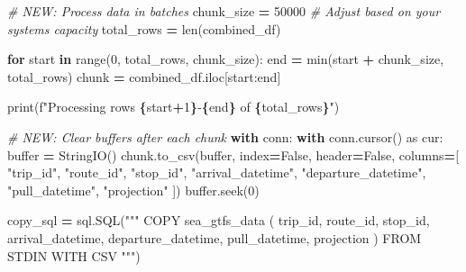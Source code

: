 \documentclass[
  12pt,
]{article}
\newenvironment{Shaded}{\begin{snugshade}}{\end{snugshade}}
\newcommand{\BuiltInTok}[1]{#1}
\newcommand{\CommentTok}[1]{\textcolor[rgb]{0.56,0.35,0.01}{\textit{#1}}}
\newcommand{\ControlFlowTok}[1]{\textcolor[rgb]{0.13,0.29,0.53}{\textbf{#1}}}
\newcommand{\DecValTok}[1]{\textcolor[rgb]{0.00,0.00,0.81}{#1}}
\newcommand{\ImportTok}[1]{#1}
\newcommand{\KeywordTok}[1]{\textcolor[rgb]{0.13,0.29,0.53}{\textbf{#1}}}
\newcommand{\NormalTok}[1]{#1}
\newcommand{\OperatorTok}[1]{\textcolor[rgb]{0.81,0.36,0.00}{\textbf{#1}}}
\newcommand{\SpecialCharTok}[1]{\textcolor[rgb]{0.81,0.36,0.00}{\textbf{#1}}}
\newcommand{\SpecialStringTok}[1]{\textcolor[rgb]{0.31,0.60,0.02}{#1}}
\newcommand{\StringTok}[1]{\textcolor[rgb]{0.31,0.60,0.02}{#1}}
\newcommand{\VariableTok}[1]{\textcolor[rgb]{0.00,0.00,0.00}{#1}}
\begin{document}
\begin{Shaded}
\begin{Highlighting}[]
        \CommentTok{\# NEW: Process data in batches}
\NormalTok{        chunk\_size }\OperatorTok{=} \DecValTok{50000}  \CommentTok{\# Adjust based on your system\textquotesingle{}s capacity}
\NormalTok{        total\_rows }\OperatorTok{=} \BuiltInTok{len}\NormalTok{(combined\_df)}
        
        \ControlFlowTok{for}\NormalTok{ start }\KeywordTok{in} \BuiltInTok{range}\NormalTok{(}\DecValTok{0}\NormalTok{, total\_rows, chunk\_size):}
\NormalTok{            end }\OperatorTok{=} \BuiltInTok{min}\NormalTok{(start }\OperatorTok{+}\NormalTok{ chunk\_size, total\_rows)}
\NormalTok{            chunk }\OperatorTok{=}\NormalTok{ combined\_df.iloc[start:end]}
            
            \BuiltInTok{print}\NormalTok{(}\SpecialStringTok{f"Processing rows }\SpecialCharTok{\{}\NormalTok{start}\OperatorTok{+}\DecValTok{1}\SpecialCharTok{\}}\SpecialStringTok{{-}}\SpecialCharTok{\{}\NormalTok{end}\SpecialCharTok{\}}\SpecialStringTok{ of }\SpecialCharTok{\{}\NormalTok{total\_rows}\SpecialCharTok{\}}\SpecialStringTok{"}\NormalTok{)}
            
            \CommentTok{\# NEW: Clear buffers after each chunk}
            \ControlFlowTok{with}\NormalTok{ conn:}
                \ControlFlowTok{with}\NormalTok{ conn.cursor() }\ImportTok{as}\NormalTok{ cur:}
                    \BuiltInTok{buffer} \OperatorTok{=}\NormalTok{ StringIO()}
\NormalTok{                    chunk.to\_csv(}\BuiltInTok{buffer}\NormalTok{, index}\OperatorTok{=}\VariableTok{False}\NormalTok{, header}\OperatorTok{=}\VariableTok{False}\NormalTok{, columns}\OperatorTok{=}\NormalTok{[}
                        \StringTok{"trip\_id"}\NormalTok{, }\StringTok{"route\_id"}\NormalTok{, }\StringTok{"stop\_id"}\NormalTok{,}
                        \StringTok{"arrival\_datetime"}\NormalTok{, }\StringTok{"departure\_datetime"}\NormalTok{,}
                        \StringTok{"pull\_datetime"}\NormalTok{, }\StringTok{"projection"}
\NormalTok{                    ])}
                    \BuiltInTok{buffer}\NormalTok{.seek(}\DecValTok{0}\NormalTok{)}
                    
\NormalTok{                    copy\_sql }\OperatorTok{=}\NormalTok{ sql.SQL(}\StringTok{"""}
\StringTok{                        COPY sea\_gtfs\_data (}
\StringTok{                            trip\_id, route\_id, stop\_id,}
\StringTok{                            arrival\_datetime, departure\_datetime,}
\StringTok{                            pull\_datetime, projection}
\StringTok{                        ) FROM STDIN WITH CSV}
\StringTok{                    """}\NormalTok{)}
                    

\end{Highlighting}
\end{Shaded}
\end{document}
